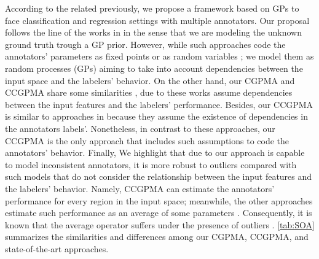 \documentclass[journal]{IEEEtran}
\begin{document}
According to the related previously, we propose a framework based on GPs to face classification and regression settings with multiple annotators. Our proposal follows the line of the works in \cite{rodrigues2014gaussian,groot2011learning,ruiz2019learning,morales2019scalable,morales2019scalable1} in the sense that we are modeling the unknown ground truth trough a GP prior. However, while such approaches code the annotators' parameters as fixed points \cite{rodrigues2014gaussian,groot2011learning} or as random variables \cite{ruiz2019learning,morales2019scalable,morales2019scalable1}; we model them as random processes (GPs) aiming to take into account dependencies between the input space and the labelers' behavior. On the other hand, our CGPMA and CCGPMA share some similarities  \cite{yan2014learning,xiao2013learning}, due to these works assume dependencies between the input features and the labelers' performance. Besides, our CCGPMA is similar to approaches in \cite{zhu2019unsupervised,gil2018learning} because they assume the existence of dependencies in the annotators labels'.
Nonetheless, in contrast to these approaches, our CCGPMA is the only approach that includes such assumptions to code the annotators' behavior. Finally, We highlight that due to our approach is capable to model inconsistent annotators, it is more robust to outliers compared with such models that do not consider the relationship between the input features and the labelers' behavior. Namely, CCGPMA can estimate the annotators' performance for every region in the input space; meanwhile, the other approaches estimate such performance as an average of some parameters \cite{rodrigues2017learning,morales2019scalable,ruiz2019learning}. Consequently, it is known that the average operator suffers under the presence of outliers \cite{kara2015modeling}. \cref{tab:SOA} summarizes the similarities and differences among our CGPMA, CCGPMA, and state-of-the-art approaches.
\end{document}
